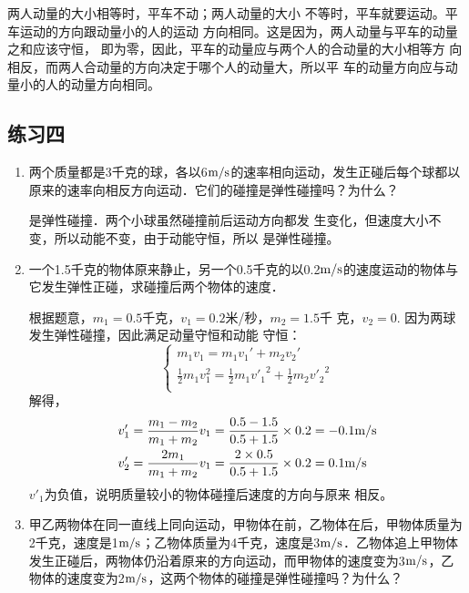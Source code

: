 \begin{enumerate}
    \begin{solution}
        两人动量的大小相等时，平车不动；两人动量的大小
        不等时，平车就要运动。平车运动的方向跟动量小的人的运动
        方向相同。这是因为，两人动量与平车的动量之和应该守恒，
        即为零，因此，平车的动量应与两个人的合动量的大小相等方
        向相反，而两人合动量的方向决定于哪个人的动量大，所以平
        车的动量方向应与动量小的人的动量方向相同。
    \end{solution}
\end{enumerate}


\subsection{练习四}
\begin{enumerate}
\item 两个质量都是3千克的球，各以6$\text{m}/\text{s}$的速率相向运动，发生正碰后每个球都以原来的速率向相反方向运动．它们的碰撞是弹性碰撞吗？为什么？


\begin{solution}
    是弹性碰撞．两个小球虽然碰撞前后运动方向都发
    生变化，但速度大小不变，所以动能不变，由于动能守恒，所以
    是弹性碰撞。
\end{solution}
\item 一个1.5千克的物体原来静止，另一个0.5千克的以0.2$\text{m}/\text{s}$的速度运动的物体与它发生弹性正碰，求碰撞后两个物体的速度．

\begin{solution}
根据题意，$m_1=0.5$千克，$v_1=0.2$米/秒，$m_2=1.5$千
克，$v_2=0$. 因为两球发生弹性碰撞，因此满足动量守恒和动能
守恒：
\[\begin{cases}
    m_1v_1=m_1v_1'+m_2v_2'\\
    \frac{1}{2}m_1v_1^2=\frac{1}{2}m_1{v'_1}^2+\frac{1}{2}m_2{v'_2}^2\\
\end{cases}\]
解得，
\[\begin{split}
v'_1&=\frac{m_1-m_2}{m_1+m_2}v_1=\frac{0.5-1.5}{0.5+1.5}\times 0.2=-0.1\text{m}/\text{s}\\
v'_2&=\frac{2m_1}{m_1+m_2}v_1=\frac{2\times 0.5}{0.5+1.5}\times 0.2=0.1\text{m}/\text{s}\\
\end{split}\]
$v'_1$为负值，说明质量较小的物体碰撞后速度的方向与原来
相反。
\end{solution}
\item 甲乙两物体在同一直线上同向运动，甲物体在前，乙物体在后，甲物体质量为2千克，速度是1$\text{m}/\text{s}$；乙物体质量为4千克，速度是3$\text{m}/\text{s}$．乙物体追上甲物体发生正碰后，两物体仍沿着原来的方向运动，而甲物体的速度变为3$\text{m}/\text{s}$，乙物体的速度变为2$\text{m}/\text{s}$，这两个物体的碰撞是弹性碰撞吗？为什么？


\end{enumerate}
